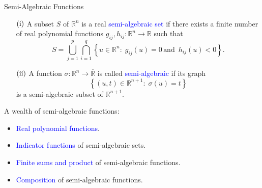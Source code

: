 \documentclass[9pt]{beamer}
\newcommand{\s}{\sigma}
\newcommand{\rr}{\mathbb{R}} %
\newcommand{\dom}[1]{\mathrm{dom}\,{#1}} %
\begin{document}
	\begin{frame}{Semi-Algebraic Functions}
        \begin{definition}
            \begin{itemize}
                \item[$\rm{(i)}$] A subset $S$ of $\rr^{n}$ is a real \textcolor{blue}{semi-algebraic set} if there exists a finite number of real polynomial functions $g_{ij} , h_{ij} : \rr^{n} \rightarrow \rr$ such that
                    \begin{equation*}
                        S = \bigcup_{j = 1}^{p} \bigcap_{i = 1}^{q} \left\{ u \in \rr^{n} : 
                        \; g_{ij}\left(u\right) = 0 \, \text{and } \, h_{ij}\left(u\right) < 
                        0 \right\}.
                    \end{equation*}
                \item[$\rm{(ii)}$] A function $\s : \rr^{n} \rightarrow \overline{\rr}$ is 
                	called \textcolor{blue}{semi-algebraic} if its graph
                    \begin{equation*}
                        \left\{ \left(u , t\right) \in \rr^{n + 1} : \; \s\left(u\right) = t 
                        \right\}
                    \end{equation*}
                    is a semi-algebraic subset of $\rr^{n + 1}$.
            \end{itemize}
        \end{definition}
        \pause
        A wealth of semi-algebraic functions:
        \begin{itemize}[<+->]
        	\item \textcolor{blue}{Real polynomial functions}.
            \item \textcolor{blue}{Indicator functions} of semi-algebraic sets.
            \item \textcolor{blue}{Finite sums and product} of semi-algebraic functions. 
            \item \textcolor{blue}{Composition} of semi-algebraic functions.
        \end{itemize}
    \end{frame}
\end{document}
